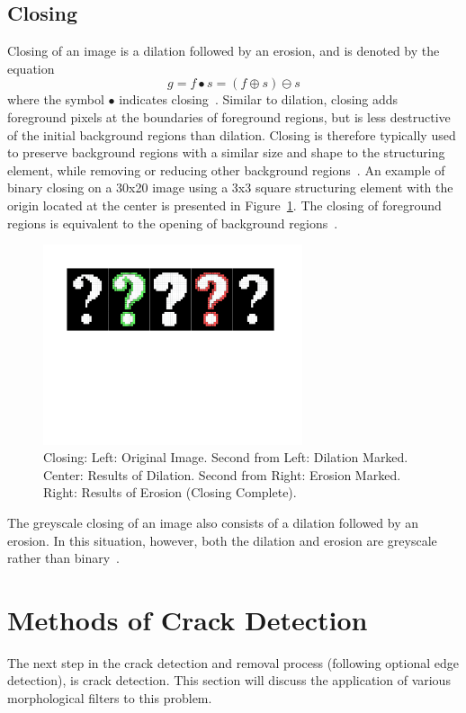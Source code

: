 \documentclass{sig-alternate}
\begin{document}
\subsection{Closing}\label{closing}
Closing of an image is a dilation followed by an erosion, and is denoted by the equation
\begin{equation*}
g = f \bullet s = (f \oplus s) \ominus s
\end{equation*}
where the symbol $\bullet$ indicates closing~\cite{MorphologyWikiAnonymous, MorphologyBook:2000}. Similar to dilation, closing adds foreground pixels at the boundaries of foreground regions, but is less destructive of the initial background regions than dilation. Closing is therefore typically used to preserve background regions with a similar size and shape to the structuring element, while removing or reducing other background regions~\cite{MorphologyWiki}. An example of binary closing on a 30x20 image using a 3x3 square structuring element with the origin located at the center is presented in Figure~\ref{binary closing figure}. The closing of foreground regions is equivalent to the opening of background regions~\cite{MorphologyWiki}.
\begin{figure}
\centering
\includegraphics[width=3in,trim={0 4.75in 0 0},clip]{closing}
\caption{Closing: Left: Original Image. Second from Left: Dilation Marked. Center: Results of Dilation. Second from Right: Erosion Marked. Right: Results of Erosion (Closing Complete).}
\label{binary closing figure}
\end{figure}

The greyscale closing of an image also consists of a dilation followed by an erosion. In this situation, however, both the dilation and erosion are greyscale rather than binary~\cite{MorphologyPaper:1987}.

\section{Methods of Crack Detection}\label{crack detection}
The next step in the crack detection and removal process (following optional edge detection), is crack detection. This section will discuss the application of various morphological filters to this problem.
\end{document}
